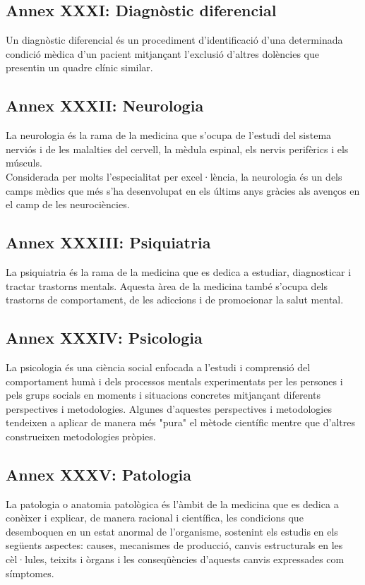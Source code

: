 \documentclass[a4paper,12pt]{article}
\begin{document}
\subsection*{Annex XXXI: Diagnòstic diferencial}
Un diagnòstic diferencial és un procediment d'identificació d'una determinada condició mèdica d'un pacient mitjançant l'exclusió d'altres dolències que presentin un quadre clínic similar.
\subsection*{Annex XXXII: Neurologia}
La neurologia és la rama de la medicina que s'ocupa de l'estudi del sistema nerviós i de les malalties del cervell, la mèdula espinal, els nervis perifèrics i els músculs.\\
Considerada per molts l'especialitat per excel·lència, la neurologia és un dels camps mèdics que més s'ha desenvolupat en els últims anys gràcies als avenços en el camp de les neurociències.
\subsection*{Annex XXXIII: Psiquiatria}
La psiquiatria és la rama de la medicina que es dedica a estudiar, diagnosticar i tractar trastorns mentals. Aquesta àrea de la medicina també s'ocupa dels trastorns de comportament, de les adiccions i de promocionar la salut mental.
\subsection*{Annex XXXIV: Psicologia}
La psicologia és una ciència social enfocada a l'estudi i comprensió del comportament humà i dels processos mentals experimentats per les persones i pels grups socials en moments i situacions concretes mitjançant diferents perspectives i metodologies. Algunes d'aquestes perspectives i metodologies tendeixen a aplicar de manera més "pura" el mètode científic mentre que d'altres construeixen metodologies pròpies.
\subsection*{Annex XXXV: Patologia}
La patologia o anatomia patològica és l'àmbit de la medicina que es dedica a conèixer i explicar, de manera racional i científica, les condicions que desemboquen en un estat anormal de l'organisme, sostenint els estudis en els següents aspectes: causes, mecanismes de producció, canvis estructurals en les cèl·lules, teixits i òrgans i les conseqüències d'aquests canvis expressades com símptomes.
\end{document}
